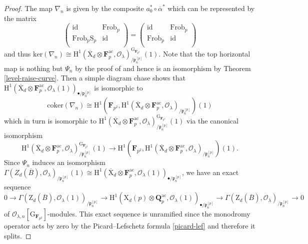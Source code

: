 \documentclass[10pt]{amsart}
\numberwithin{equation}{section}
\theoremstyle{plain}
\numberwithin{equation}{section}
\theoremstyle{definition}
\theoremstyle{remark}
\def\coker{\mathrm{coker}}
\def\Frob{\mathrm{Frob}}
\def\ac{\mathrm{ac}}
\def\ac{\mathrm{ac}}
\def\calO{\mathcal{O}}
\def\frakp{\mathfrak{p}}
\def\FF{\mathbf{F}}
\def\QQ{\mathbf{Q}}
\def\rmG{\mathrm{G}}
\def\rmH{\mathrm{H}}
\def\rmX{\mathrm{X}}
\def\rmS{\mathrm{S}}
\def\rmZ{\mathrm{Z}}
\begin{document}
\begin{proof}
The map $\nabla_{n}$ is given by the composite $ a^{\ast}_{0}\circ\overline{\alpha}^{\ast}$ which can be represented by the matrix
\begin{equation*}
\begin{pmatrix}
\mathrm{id} &   \Frob_{p}\\
\Frob_{p}\rmS_{p} & \mathrm{id}\\ 
\end{pmatrix}=
\begin{pmatrix}
\mathrm{id} &   \Frob_{p}\\
\Frob_{p} & \mathrm{id}\\ 
\end{pmatrix}
\end{equation*}
and thus $\mathrm{ker}(\nabla_{n})\cong\rmH^{1}(\overline{\rmX}_{d}\otimes{\FF^{\ac}_{p}}, \calO_{\lambda})^{\rmG_{\FF_{p^{2}}}}_{/\frakp^{[p]}_{n}}(1)$. Note that the top horizontal map is nothing but $\Psi_{n}$ by the proof of \cite[Proposition 4.8]{LT} and hence is an isomorphism by Theorem \ref{level-raise-curve}. Then a simple diagram chase shows that $\rmH^{1}(\overline{\rmX}_{d}\otimes{\FF^{\ac}_{p}}, \calO_{\lambda}(1))_{\bullet/\frakp^{[p]}_{n}}$ is isomorphic to 
\begin{equation*}
\coker(\nabla_{n})\cong\rmH^{1}(\FF_{p^{2}}, \rmH^{1}(\overline{\rmX}_{d}\otimes{\FF^{\ac}_{p}}, \calO_{\lambda})_{/\frakp^{[p]}_{n}})(1)
\end{equation*}
which in turn is isomorphic to $\rmH^{1}(\overline{\rmX}_{d}\otimes{\FF^{\ac}_{p}}, \calO_{\lambda})^{\rmG_{\FF_{p^{2}}}}_{/\frakp^{[p]}_{n}}(1)$ via the canonical isomorphism 
\begin{equation*}
\rmH^{1}(\overline{\rmX}_{d}\otimes{\FF^{\ac}_{p}}, \calO_{\lambda})^{\rmG_{\FF_{p^{2}}}}_{/\frakp^{[p]}_{n}}(1)\rightarrow \rmH^{1}(\FF_{p^{2}}, \rmH^{1}(\overline{\rmX}_{d}\otimes{\FF^{\ac}_{p}}, \calO_{\lambda})_{/\frakp^{[p]}_{n}})(1).
\end{equation*} 
Since $\Psi_{n}$ induces an isomorphism
$\Gamma(Z_{d}(\overline{B}), \calO_{\lambda})_{/\frakp^{[p]}_{n}}(1)\cong\rmH^{1}(\overline{\rmX}_{d}\otimes{\FF^{\ac}_{p}}, \calO_{\lambda}(1))_{\bullet/\frakp^{[p]}_{n}}$, we have an exact sequence 
\begin{equation}\label{quotient-exact}
0\rightarrow\Gamma(\rmZ_{d}(\overline{B}), \calO_{\lambda}(1))_{/\frakp^{[p]}_{n}}\rightarrow \rmH^{1}({\rmX}_{d}(p)\otimes{\QQ^{\ac}_{p}}, \calO_{\lambda}(1))_{\bullet/\frakp^{[p]}_{n}}\rightarrow \Gamma(\rmZ_{d}(\overline{B}), \calO_{\lambda})_{/\frakp^{[p]}_{n}}\rightarrow0
\end{equation}
of $\calO_{\lambda, n}[\rmG_{\FF_{p^{2}}}]$-modules. This exact sequence is unramified since the monodromy operator acts by zero by the Picard--Lefschetz formula \ref{picard-lef} and therefore it splits.


\end{proof}
\end{document}
